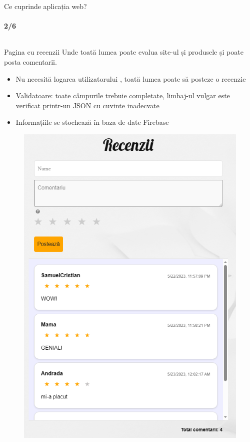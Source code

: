 \documentclass{beamer}
\begin{document}
\begin{darkframes}
		\begin{frame}[label=math]{Ce cuprinde aplicația web?}
			\vspace{-1em}
			\framesubtitle{2/6}
			\begin{columns}[t]
				\begin{column}{1\textwidth}
					\begin{exampleblock}{Pagina cu recenzii}
						\tiny
						Unde toată lumea poate \alert{evalua site-ul și produsele și poate posta comentarii}.
						\begin{itemize}
							\item Nu necesită logarea utilizatorului , toată lumea poate să posteze o recenzie
							\item Validatoare: toate câmpurile trebuie completate, limbaj-ul vulgar este verificat printr-un JSON cu cuvinte inadecvate
							\item Informațiile se stochează în baza de date Firebase
						\end{itemize}
					\end{exampleblock}
					\vspace{-1em}
					\begin{figure}[!tbp]
						\centering
						\begin{minipage}[b]{0.29\textwidth}
							\includegraphics[width=\textwidth]{recenzii.png}

\end{minipage}
\end{figure}
\end{column}
\end{columns}
\end{frame}
\end{darkframes}
\end{document}
